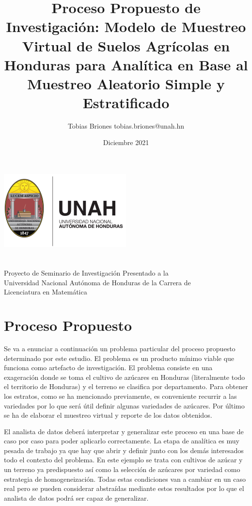 \documentclass{article}
\title{Proceso Propuesto de Investigación: Modelo de Muestreo Virtual de Suelos Agrícolas en Honduras para Analítica en Base al Muestreo Aleatorio Simple y Estratificado}
\author{Tobias Briones \bigbreak tobias.briones@unah.hn}
\date{Diciembre 2021}
\begin{document}
\makeatletter
    \begin{titlepage}
        \begin{center}
            \includegraphics[width=0.3\linewidth]{ref/logo-unah.png}\\[4ex]
            {\huge \bfseries \@title
            \vspace{1cm}}\\[2ex]
            {\LARGE \@author}\\[50ex]

            {\large
            Proyecto de Seminario de Investigación Presentado a la\\
            Universidad Nacional Autónoma de Honduras de la Carrera de\\
            Licenciatura en Matemática
            }\\[2ex]

            {\large \@date}
        \end{center}
    \end{titlepage}
\makeatother
\thispagestyle{empty}
\newpage

\section{Proceso Propuesto}

Se va a enunciar a continuación un problema particular del proceso propuesto determinado por este estudio. El problema es un producto mínimo viable que funciona como artefacto de investigación. El problema consiste en una exageración donde se toma el cultivo de azúcares en Honduras (literalmente todo el territorio de Honduras) y el terreno se clasifica por departamento. Para obtener los estratos, como se ha mencionado previamente, es conveniente recurrir a las variedades por lo que será útil definir algunas variedades de azúcares. Por último se ha de elaborar el muestreo virtual y reporte de los datos obtenidos.

\bigbreak

El analista de datos deberá interpretar y generalizar este proceso en una base de caso por caso para poder aplicarlo correctamente. La etapa de analítica es muy pesada de trabajo ya que hay que abrir y definir junto con los demás interesados todo el contexto del problema. En este ejemplo se trata con cultivos de azúcar y un terreno ya predispuesto así como la selección de azúcares por variedad como estrategia de homogeneización. Todas estas condiciones van a cambiar en un caso real pero se pueden considerar abstraídas mediante estos resultados por lo que el analista de datos podrá ser capaz de generalizar.
\end{document}
